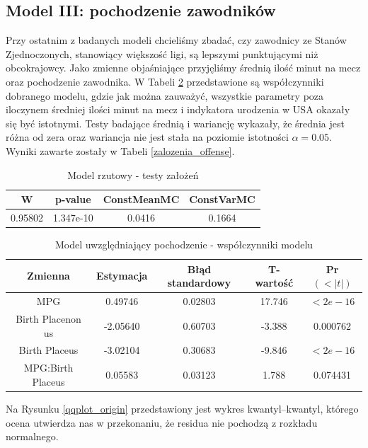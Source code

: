 \documentclass[11pt,a4paper]{article}
\begin{document}
\subsection{Model III: pochodzenie zawodników}
Przy ostatnim z badanych modeli chcieliśmy zbadać, czy zawodnicy ze Stanów Zjednoczonych, stanowiący większość ligi, są lepszymi punktującymi niż obcokrajowcy.
Jako zmienne objaśniające przyjęliśmy średnią ilość minut na mecz oraz pochodzenie zawodnika. W Tabeli \ref{origin} przedstawione są współczynniki dobranego modelu, gdzie jak można zauważyć, wszystkie parametry poza iloczynem średniej ilości minut na mecz i indykatora urodzenia w USA okazały się być istotnymi.
Testy badające średnią i wariancję wykazały, że średnia jest różna od zera oraz wariancja nie jest stała na poziomie istotności $\alpha=0.05$. Wyniki zawarte zostały w Tabeli \ref{zalozenia_offense}.
\begin{table}[H]
	\begin{center}
		\begin{tabular}{| c | c | c | c |}
			\hline
			W & p-value & ConstMeanMC & ConstVarMC\\ \hline
			0.95802 & 1.347e-10 & 0.0416 & 0.1664 \\ \hline
		\end{tabular}
		\caption{Model rzutowy - testy założeń}
		\label{zalozenia_origin}
	\end{center}
\end{table}
\begin{table}[H]
	\begin{center}
		\begin{tabular}{| c | c | c | c | c |}
			\hline
			Zmienna & Estymacja & Błąd standardowy & T-wartość & Pr$(<|t|)$\\ \hline
			MPG    &            0.49746  &  0.02803 & 17.746 & $< 2e-16$\\ \hline
			Birth Placenon us & -2.05640 &   0.60703&  -3.388 & 0.000762 \\ \hline
			Birth Placeus   &  -3.02104  &  0.30683 & -9.846  & $< 2e-16$ \\ \hline
			MPG:Birth Placeus & 0.05583  &  0.03123 &  1.788 & 0.074431 \\ \hline
		\end{tabular}
		\caption{Model uwzględniający pochodzenie - współczynniki modelu}
		\label{origin}
	\end{center}
\end{table}
Na Rysunku \ref{qqplot_origin} przedstawiony jest wykres kwantyl--kwantyl, którego ocena utwierdza nas w przekonaniu, że residua nie pochodzą z rozkładu normalnego.
\end{document}
